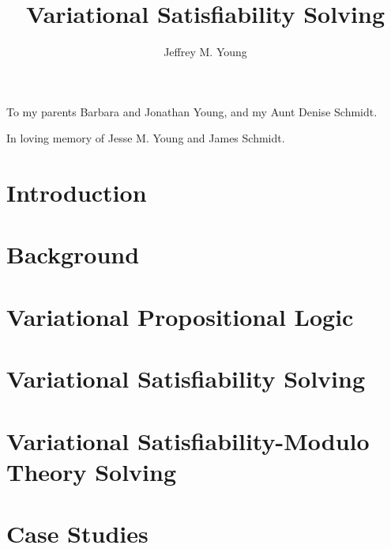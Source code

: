 \documentclass[submission]{beavtex}
\title{Variational Satisfiability Solving}
\author{Jeffrey M. Young}
\begin{document}
\maketitle

\mainmatter{}


\begin{dedication*}
  To my parents Barbara and Jonathan Young, and my Aunt Denise Schmidt.

  In loving memory of Jesse M. Young and James Schmidt.
\end{dedication*}

\chapter{Introduction}


\chapter{Background}


\chapter{Variational Propositional Logic}


\chapter{Variational Satisfiability Solving}


\chapter{Variational Satisfiability-Modulo Theory Solving}


\chapter{Case Studies}

\end{document}
